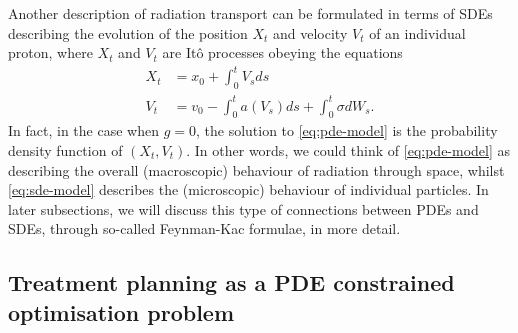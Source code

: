 Another description of radiation transport can be formulated in terms of SDEs describing the evolution of the position $X_t$ and velocity $V_t$ of an individual proton, where $X_t$ and $V_t$ are Itô processes obeying the equations
%
\begin{align} 
    \label{eq:sde-model}
    X_t &= x_0 + \int_{0}^{t} V_s ds\\ 
    V_t &= v_0 - \int_{0}^{t} a(V_s) ds + \int_{0}^{t} \sigma dW_s.
\end{align}
%
In fact, in the case when $g=0$, the solution to \autoref{eq:pde-model} is the probability density function of $(X_t,V_t)$. In other words, we could think of \autoref{eq:pde-model} as describing the overall (macroscopic) behaviour of radiation through space, whilst \autoref{eq:sde-model} describes the (microscopic) behaviour of individual particles. In later subsections, we will discuss this type of connections between PDEs and SDEs, through so-called Feynman-Kac formulae, in more detail.

\subsection{Treatment planning as a PDE constrained optimisation problem}











